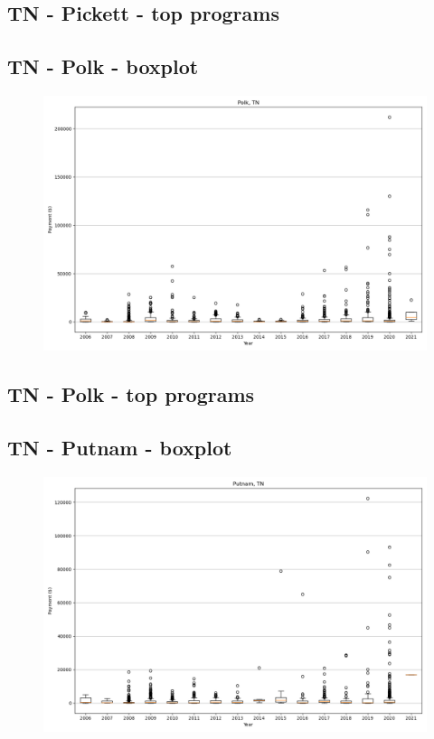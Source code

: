 \subsection*{TN - Pickett - top programs}

\newpage
\subsection*{TN - Polk - boxplot}
\begin{figure}[h]
\centering
\includegraphics[width=7in]{../output/boxplots/counties/Polk-TN_boxplot.png}
\end{figure}


\subsection*{TN - Polk - top programs}

\newpage
\subsection*{TN - Putnam - boxplot}
\begin{figure}[h]
\centering
\includegraphics[width=7in]{../output/boxplots/counties/Putnam-TN_boxplot.png}
\end{figure}


